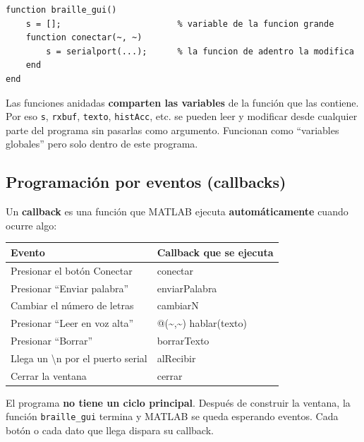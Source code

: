 \documentclass[11pt,a4paper]{article}
\newcommand{\cod}[1]{\texttt{#1}}
\begin{document}
\begin{lstlisting}
function braille_gui()
    s = [];                       % variable de la funcion grande
    function conectar(~, ~)
        s = serialport(...);      % la funcion de adentro la modifica
    end
end
\end{lstlisting}

\begin{idea}
Las funciones anidadas \textbf{comparten las variables} de la función que las
contiene. Por eso \cod{s}, \cod{rxbuf}, \cod{texto}, \cod{histAcc}, etc. se pueden
leer y modificar desde cualquier parte del programa sin pasarlas como
argumento. Funcionan como ``variables globales'' pero solo dentro de este
programa.
\end{idea}

\subsection{Programación por eventos (callbacks)}
Un \textbf{callback} es una función que MATLAB ejecuta \textbf{automáticamente}
cuando ocurre algo:

\begin{center}
\begin{tabular}{>{\raggedright}p{6.4cm} >{\ttfamily\raggedright\arraybackslash}p{6.8cm}}
\toprule
\textbf{Evento} & \normalfont\textbf{Callback que se ejecuta} \\
\midrule
Presionar el botón Conectar & conectar \\
Presionar ``Enviar palabra'' & enviarPalabra \\
Cambiar el número de letras & cambiarN \\
Presionar ``Leer en voz alta'' & @(\textasciitilde,\textasciitilde) hablar(texto) \\
Presionar ``Borrar'' & borrarTexto \\
Llega un \textbackslash n por el puerto serial & alRecibir \\
Cerrar la ventana & cerrar \\
\bottomrule
\end{tabular}
\end{center}

\begin{idea}
El programa \textbf{no tiene un ciclo principal}. Después de construir la ventana,
la función \cod{braille\_gui} termina y MATLAB se queda esperando eventos. Cada
botón o cada dato que llega dispara su callback.
\end{idea}
\end{document}

